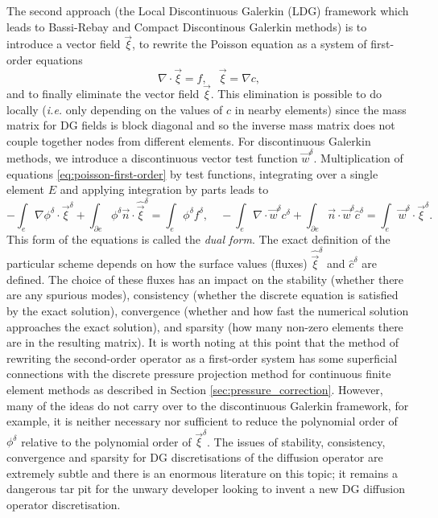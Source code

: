 The second approach (the Local Discontinuous Galerkin (LDG) framework
\citep{cockburn1998,sherwin2006} which leads to Bassi-Rebay and
Compact Discontinous Galerkin methods) is to introduce a vector field
$\vec{\xi}$, to rewrite the Poisson equation as a system of
first-order equations
\begin{equation}
\label{eq:poisson-first-order}
\nabla\cdot\vec{\xi} = f, \quad \vec{\xi}=\nabla c,
\end{equation}
and to finally eliminate the vector field $\vec{\xi}$. This
elimination is possible to do locally (\emph{i.e.} only depending on
the values of $c$ in nearby elements) since the mass matrix for DG
fields is block diagonal and so the inverse mass matrix does not
couple together nodes from different elements. For discontinuous
Galerkin methods, we introduce a discontinuous vector test function
$\vec{w}^{\delta}$. Multiplication of equations
\eqref{eq:poisson-first-order} by test functions, integrating over a
single element $E$ and applying integration by parts leads to
\begin{equation}
\label{eq:ldg}
-\int_e\nabla\phi^{\delta}\cdot\vec{\xi}^\delta + \int_{\partial e}
\phi^\delta\vec{n}\cdot\hat{\vec{\xi}}^{\delta} =
\int_e\phi^\delta f^\delta,
\quad
-\int_e\nabla\cdot\vec{w}^\delta c^\delta + \int_{\partial e}
\vec{n}\cdot\vec{w}^\delta \hat{c}^\delta = \int_e\vec{w}^\delta\cdot\vec{\xi}^\delta.
\end{equation}
This form of the equations is called the \emph{dual form}.  The exact
definition of the particular scheme depends on how the surface values
(fluxes) $\hat{\vec{\xi}}^\delta$ and $\hat{c}^\delta$ are
defined. The choice of these fluxes has an impact on the stability
(whether there are any spurious modes), consistency (whether the
discrete equation is satisfied by the exact solution), convergence
(whether and how fast the numerical solution approaches the exact
solution), and sparsity (how many non-zero elements there are in the
resulting matrix). It is worth noting at this point that the method of
rewriting the second-order operator as a first-order system has some
superficial connections with the discrete pressure projection method
for continuous finite element methods as described in Section
\ref{sec:pressure_correction}. However, many of the ideas do not
carry over to the discontinuous Galerkin framework, for example, it is
neither necessary nor sufficient to reduce the polynomial order of
$\phi^\delta$ relative to the polynomial order of
$\vec{\xi}^\delta$. The issues of stability, consistency, convergence
and sparsity for DG discretisations of the diffusion operator are
extremely subtle and there is an enormous literature on this topic; it
remains a dangerous tar pit for the unwary developer looking to invent
a new DG diffusion operator discretisation.

